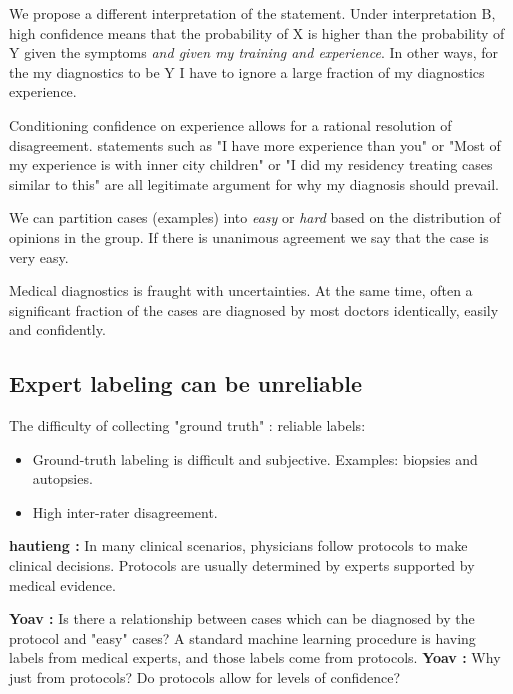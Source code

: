 \documentclass[10pt]{wlscirep}
\newcommand{\comment}[3]{{\color{#1} {\bf #2 :} #3}}
\newcommand{\hautieng}[1]{\comment{blue}{hautieng}{#1}}
\newcommand{\yoav}[1]{\comment{red}{Yoav}{#1}}
\begin{document}
We propose a different interpretation of the statement. Under interpretation B, high confidence means that the probability of X is higher than the probability of Y given the symptoms {\em and given my training and experience}. In other ways, for the my diagnostics to be Y I have to ignore a large fraction of my diagnostics experience.

Conditioning confidence on experience allows for a rational resolution of disagreement. statements such as
"I have more experience than you" or "Most of my experience is with inner city children" or "I did my residency treating cases similar to this" are all legitimate argument for why my diagnosis should prevail.



We can partition cases (examples) into {\em easy} or {\em hard} based on the distribution of opinions in the group. If  there is unanimous agreement we say that the case is very easy. 


Medical diagnostics is fraught with uncertainties. At the same time, often a significant fraction of the cases are diagnosed by most doctors identically, easily and confidently.



\subsection*{Expert labeling can be unreliable \label{sec:UnreliableExperts}}
The difficulty of collecting "ground truth" : reliable labels:
\begin{itemize}
    \item Ground-truth labeling is difficult and subjective. Examples: biopsies and autopsies.
    \item High inter-rater disagreement.
\end{itemize}


\hautieng{
In many clinical scenarios, physicians follow protocols to make clinical decisions. Protocols are usually determined by experts supported by medical evidence. }

\yoav{Is there a relationship between cases which can be diagnosed by the protocol and "easy" cases?}
%
A standard machine learning procedure is having labels from medical experts, and those labels come from protocols.
\yoav{Why just from protocols? Do protocols allow for levels of confidence?}
\end{document}
